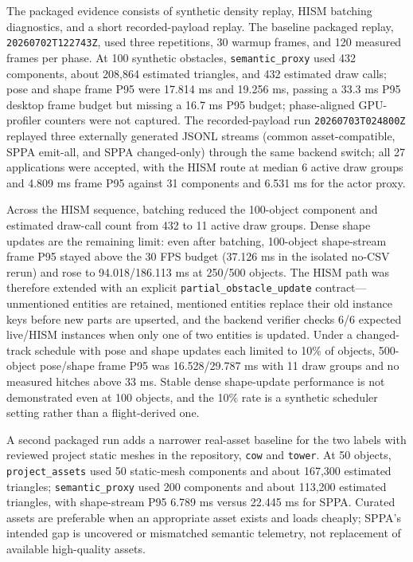 \documentclass[10pt]{article}
\begin{document}
The packaged evidence consists of synthetic density replay, HISM batching
diagnostics, and a short recorded-payload replay. The baseline packaged replay,
\texttt{20260702T122743Z}, used three repetitions, 30 warmup frames, and 120
measured frames per phase. At 100 synthetic obstacles,
\texttt{semantic\_proxy} used 432 components, about 208,864 estimated triangles,
and 432 estimated draw calls; pose and shape frame P95 were 17.814 ms and
19.256 ms, passing a 33.3 ms P95 desktop frame budget but missing a 16.7 ms
P95 budget; phase-aligned GPU-profiler counters were not captured. The
recorded-payload run \texttt{20260703T024800Z} replayed three externally
generated JSONL streams (common asset-compatible, SPPA emit-all, and SPPA
changed-only) through the same backend switch; all 27 applications were
accepted, with the HISM route at median 6 active draw groups and 4.809 ms
frame P95 against 31 components and 6.531 ms for the actor proxy.

Across the HISM sequence, batching reduced the
100-object component and estimated draw-call count from 432 to 11 active draw
groups. Dense shape updates are the remaining limit:
even after batching, 100-object shape-stream frame P95 stayed above the 30 FPS
budget (37.126 ms in the isolated no-CSV rerun) and rose to 94.018/186.113 ms
at 250/500 objects. The HISM path was therefore extended with an explicit
\texttt{partial\_obstacle\_update} contract---unmentioned entities are retained,
mentioned entities replace their old instance keys before new parts are
upserted, and the backend verifier checks 6/6 expected live/HISM instances when
only one of two entities is updated. Under a changed-track schedule with pose
and shape updates each limited to 10\% of objects, 500-object pose/shape frame
P95 was 16.528/29.787 ms with 11 draw groups and no measured hitches above
33 ms. Stable dense shape-update performance is not demonstrated even at 100
objects, and the 10\% rate is a synthetic scheduler setting rather than a
flight-derived one.

A second packaged run adds a narrower real-asset baseline for the two labels
with reviewed project static meshes in the repository, \texttt{cow} and
\texttt{tower}. At 50 objects, \texttt{project\_assets} used 50 static-mesh
components and about 167,300 estimated triangles; \texttt{semantic\_proxy} used
200 components and about 113,200 estimated triangles, with shape-stream P95
6.789 ms versus 22.445 ms for SPPA. Curated assets are preferable when an
appropriate asset exists and loads cheaply; SPPA's intended gap is uncovered or
mismatched semantic telemetry, not replacement of available high-quality
assets.
\end{document}
